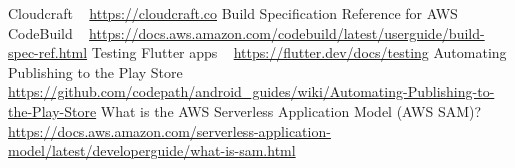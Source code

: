 \documentclass[10pt, a4paper]{article}
\begin{document}
\begin{thebibliography}{9}
Cloudcraft ~ \url{https://cloudcraft.co}
Build Specification Reference for AWS CodeBuild ~ \url{https://docs.aws.amazon.com/codebuild/latest/userguide/build-spec-ref.html}
Testing Flutter apps ~ \url{https://flutter.dev/docs/testing}
Automating Publishing to the Play Store ~ \url{https://github.com/codepath/android_guides/wiki/Automating-Publishing-to-the-Play-Store}
What is the AWS Serverless Application Model (AWS SAM)? ~ \url{https://docs.aws.amazon.com/serverless-application-model/latest/developerguide/what-is-sam.html}
\end{thebibliography}
\end{document}
